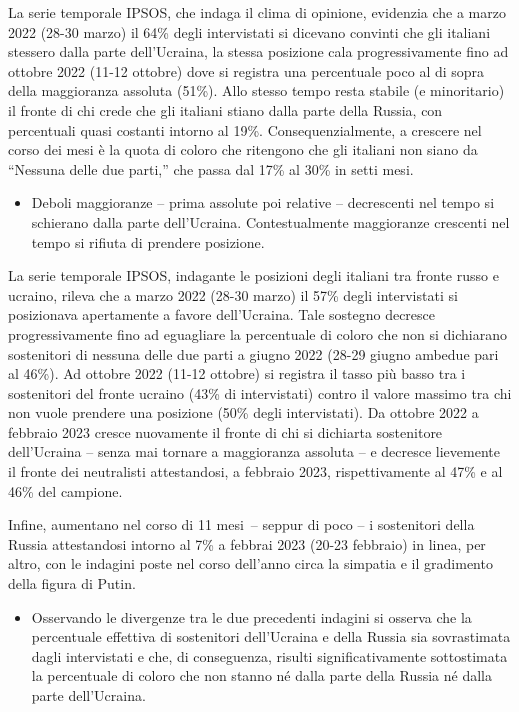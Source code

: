 \documentclass[
]{book}
\providecommand{\tightlist}{%
  \setlength{\itemsep}{0pt}\setlength{\parskip}{0pt}}
\begin{document}
La serie temporale IPSOS, che indaga il clima di opinione, evidenzia che a marzo 2022 (28-30 marzo) il 64\% degli intervistati si dicevano convinti che gli italiani stessero dalla parte dell'Ucraina, la stessa posizione cala progressivamente fino ad ottobre 2022 (11-12 ottobre) dove si registra una percentuale poco al di sopra della maggioranza assoluta (51\%). Allo stesso tempo resta stabile (e minoritario) il fronte di chi crede che gli italiani stiano dalla parte della Russia, con percentuali quasi costanti intorno al 19\%. Consequenzialmente, a crescere nel corso dei mesi è la quota di coloro che ritengono che gli italiani non siano da ``Nessuna delle due parti,'' che passa dal 17\% al 30\% in setti mesi.

\begin{itemize}
\tightlist
\item
  Deboli maggioranze -- prima assolute poi relative -- decrescenti nel tempo si schierano dalla parte dell'Ucraina. Contestualmente maggioranze crescenti nel tempo si rifiuta di prendere posizione.
\end{itemize}

La serie temporale IPSOS, indagante le posizioni degli italiani tra fronte russo e ucraino, rileva che a marzo 2022 (28-30 marzo) il 57\% degli intervistati si posizionava apertamente a favore dell'Ucraina. Tale sostegno decresce progressivamente fino ad eguagliare la percentuale di coloro che non si dichiarano sostenitori di nessuna delle due parti a giugno 2022 (28-29 giugno ambedue pari al 46\%). Ad ottobre 2022 (11-12 ottobre) si registra il tasso più basso tra i sostenitori del fronte ucraino (43\% di intervistati) contro il valore massimo tra chi non vuole prendere una posizione (50\% degli intervistati). Da ottobre 2022 a febbraio 2023 cresce nuovamente il fronte di chi si dichiarta sostenitore dell'Ucraina -- senza mai tornare a maggioranza assoluta -- e decresce lievemente il fronte dei neutralisti attestandosi, a febbraio 2023, rispettivamente al 47\% e al 46\% del campione.

Infine, aumentano nel corso di 11 mesi~-- seppur di poco -- i sostenitori della Russia attestandosi intorno al 7\% a febbrai 2023 (20-23 febbraio) in linea, per altro, con le indagini poste nel corso dell'anno circa la simpatia e il gradimento della figura di Putin.

\begin{itemize}
\tightlist
\item
  Osservando le divergenze tra le due precedenti indagini si osserva che la percentuale effettiva di sostenitori dell'Ucraina e della Russia sia sovrastimata dagli intervistati e che, di conseguenza, risulti significativamente sottostimata la percentuale di coloro che non stanno né dalla parte della Russia né dalla parte dell'Ucraina.
\end{itemize}
\end{document}
